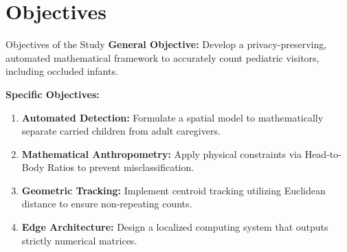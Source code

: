 \section{Objectives}

\begin{frame}{Objectives of the Study}
    \textbf{General Objective:} Develop a privacy-preserving, automated mathematical framework to accurately count pediatric visitors, including occluded infants.
    
    \vspace{0.4cm}
    \textbf{Specific Objectives:}
    \begin{enumerate}
        \item \textbf{Automated Detection:} Formulate a spatial model to mathematically separate carried children from adult caregivers.
        \item \textbf{Mathematical Anthropometry:} Apply physical constraints via Head-to-Body Ratios to prevent misclassification.
        \item \textbf{Geometric Tracking:} Implement centroid tracking utilizing Euclidean distance to ensure non-repeating counts.
        \item \textbf{Edge Architecture:} Design a localized computing system that outputs strictly numerical matrices.
    \end{enumerate}
\end{frame}
